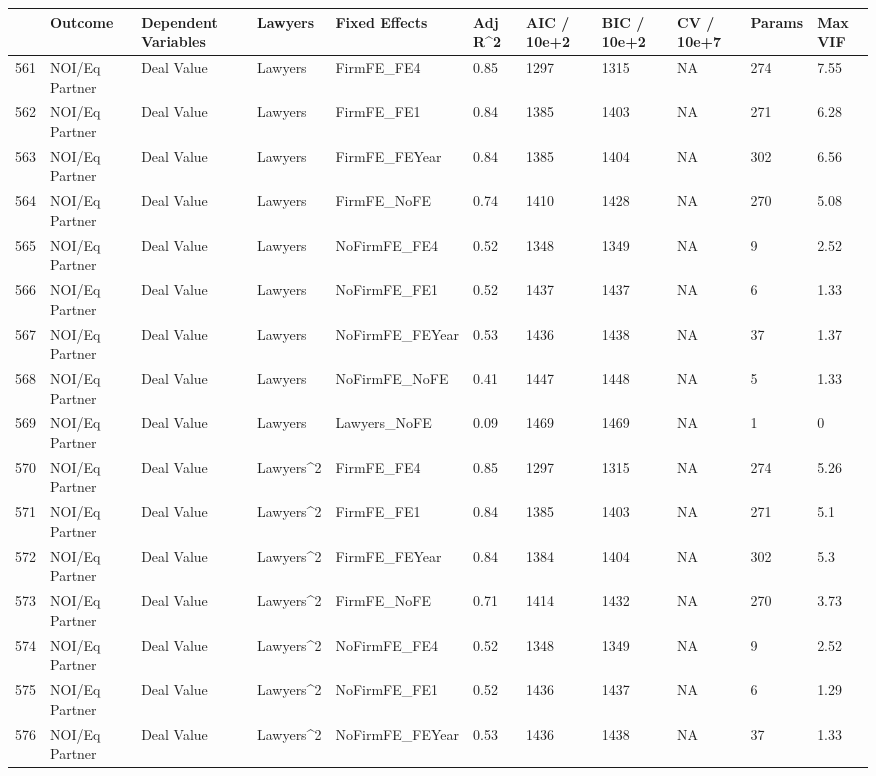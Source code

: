 \documentclass{article}
\begin{document}
\begin{table}[H]
\centering
\begin{tabular}{rllllllllll}
  \hline
 & Outcome & Dependent Variables & Lawyers & Fixed Effects & Adj R^2 & AIC / 10e+2 & BIC / 10e+2 & CV / 10e+7 & Params & Max VIF \\ 
  \hline
561 & NOI/Eq Partner & Deal Value & Lawyers & FirmFE\_FE4 & 0.85 & 1297 & 1315 & NA & 274 & 7.55 \\ 
  562 & NOI/Eq Partner & Deal Value & Lawyers & FirmFE\_FE1 & 0.84 & 1385 & 1403 & NA & 271 & 6.28 \\ 
  563 & NOI/Eq Partner & Deal Value & Lawyers & FirmFE\_FEYear & 0.84 & 1385 & 1404 & NA & 302 & 6.56 \\ 
  564 & NOI/Eq Partner & Deal Value & Lawyers & FirmFE\_NoFE & 0.74 & 1410 & 1428 & NA & 270 & 5.08 \\ 
  565 & NOI/Eq Partner & Deal Value & Lawyers & NoFirmFE\_FE4 & 0.52 & 1348 & 1349 & NA & 9 & 2.52 \\ 
  566 & NOI/Eq Partner & Deal Value & Lawyers & NoFirmFE\_FE1 & 0.52 & 1437 & 1437 & NA & 6 & 1.33 \\ 
  567 & NOI/Eq Partner & Deal Value & Lawyers & NoFirmFE\_FEYear & 0.53 & 1436 & 1438 & NA & 37 & 1.37 \\ 
  568 & NOI/Eq Partner & Deal Value & Lawyers & NoFirmFE\_NoFE & 0.41 & 1447 & 1448 & NA & 5 & 1.33 \\ 
  569 & NOI/Eq Partner & Deal Value & Lawyers & Lawyers\_NoFE & 0.09 & 1469 & 1469 & NA & 1 & 0 \\ 
  570 & NOI/Eq Partner & Deal Value & Lawyers^2 & FirmFE\_FE4 & 0.85 & 1297 & 1315 & NA & 274 & 5.26 \\ 
  571 & NOI/Eq Partner & Deal Value & Lawyers^2 & FirmFE\_FE1 & 0.84 & 1385 & 1403 & NA & 271 & 5.1 \\ 
  572 & NOI/Eq Partner & Deal Value & Lawyers^2 & FirmFE\_FEYear & 0.84 & 1384 & 1404 & NA & 302 & 5.3 \\ 
  573 & NOI/Eq Partner & Deal Value & Lawyers^2 & FirmFE\_NoFE & 0.71 & 1414 & 1432 & NA & 270 & 3.73 \\ 
  574 & NOI/Eq Partner & Deal Value & Lawyers^2 & NoFirmFE\_FE4 & 0.52 & 1348 & 1349 & NA & 9 & 2.52 \\ 
  575 & NOI/Eq Partner & Deal Value & Lawyers^2 & NoFirmFE\_FE1 & 0.52 & 1436 & 1437 & NA & 6 & 1.29 \\ 
  576 & NOI/Eq Partner & Deal Value & Lawyers^2 & NoFirmFE\_FEYear & 0.53 & 1436 & 1438 & NA & 37 & 1.33 \\ 

\end{tabular}
\end{table}
\end{document}
